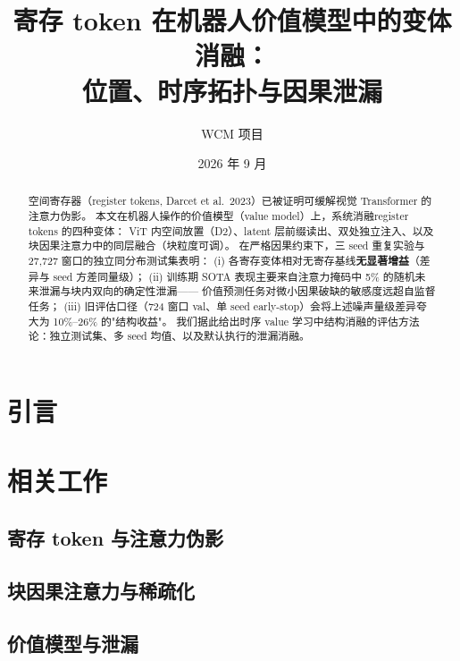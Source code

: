 \documentclass[10pt,a4paper]{article}
\title{\textbf{寄存 token 在机器人价值模型中的变体消融：\\位置、时序拓扑与因果泄漏}}
\author{WCM 项目}
\date{2026 年 9 月}
\newcommand{\Regs}{register tokens}
\begin{document}
\maketitle

\begin{abstract}
空间寄存器（register tokens, Darcet et al.\ 2023）已被证明可缓解视觉 Transformer 的注意力伪影。
本文在机器人操作的价值模型（value model）上，系统消融\Regs{} 的四种变体：
ViT 内空间放置（D2）、latent 层前缀读出、双处独立注入、以及块因果注意力中的同层融合（块粒度可调）。
在严格因果约束下，三 seed 重复实验与 27{,}727 窗口的独立同分布测试集表明：
(i) 各寄存变体相对无寄存基线\textbf{无显著增益}（差异与 seed 方差同量级）；
(ii) 训练期 SOTA 表现主要来自注意力掩码中 5\% 的随机未来泄漏与块内双向的确定性泄漏——
价值预测任务对微小因果破缺的敏感度远超自监督任务；
(iii) 旧评估口径（724 窗口 val、单 seed early-stop）会将上述噪声量级差异夸大为 10\%--26\% 的"结构收益"。
我们据此给出时序 value 学习中结构消融的评估方法论：独立测试集、多 seed 均值、以及默认执行的泄漏消融。
\end{abstract}

\section{引言}

\section{相关工作}
\subsection{寄存 token 与注意力伪影}
\subsection{块因果注意力与稀疏化}
\subsection{价值模型与泄漏}
\end{document}
